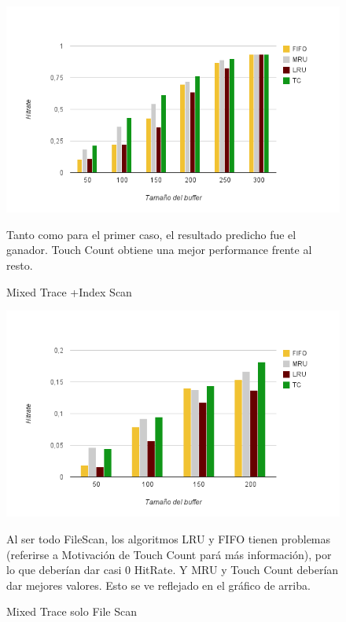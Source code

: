 
\begin{figure}[ht]
\includegraphics[scale=.80]{grafico2-2}
\caption{Mixed Trace +Index Scan}
Tanto como para el primer caso, el resultado predicho fue el ganador. Touch Count obtiene una mejor performance frente al resto.
\end{figure}

\clearpage

\begin{figure}[Ht]
\includegraphics[scale=.80]{grafico3}
\caption{Mixed Trace solo File Scan}
Al ser todo FileScan, los algoritmos LRU y FIFO tienen problemas (referirse a Motivación de Touch Count pará más información), por lo que deberían dar casi 0 HitRate.
Y MRU y Touch Count deberían dar mejores valores. Esto se ve reflejado en el gráfico de arriba.
\end{figure}



